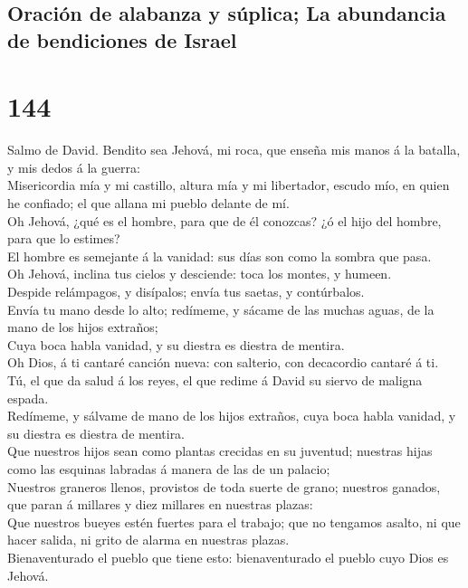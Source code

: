 \hypertarget{oraciuxf3n-de-alabanza-y-suxfaplica-la-abundancia-de-bendiciones-de-israel}{%
\subsection{Oración de alabanza y súplica; La abundancia de bendiciones
de
Israel}\label{oraciuxf3n-de-alabanza-y-suxfaplica-la-abundancia-de-bendiciones-de-israel}}

\hypertarget{section-19-144}{%
\section{144}\label{section-19-144}}

 Salmo de David. Bendito sea Jehová, mi roca, que enseña
mis manos á la batalla, y mis dedos á la guerra:\\
 Misericordia mía y mi castillo, altura mía y mi
libertador, escudo mío, en quien he confiado; el que allana mi pueblo
delante de mí.\\
 Oh Jehová, ¿qué es el hombre, para que de él conozcas? ¿ó
el hijo del hombre, para que lo estimes?\\
 El hombre es semejante á la vanidad: sus días son como la
sombra que pasa.\\
 Oh Jehová, inclina tus cielos y desciende: toca los
montes, y humeen.\\
 Despide relámpagos, y disípalos; envía tus saetas, y
contúrbalos.\\
 Envía tu mano desde lo alto; redímeme, y sácame de las
muchas aguas, de la mano de los hijos extraños;\\
 Cuya boca habla vanidad, y su diestra es diestra de
mentira.\\
 Oh Dios, á ti cantaré canción nueva: con salterio, con
decacordio cantaré á ti.\\
 Tú, el que da salud á los reyes, el que redime á David
su siervo de maligna espada.\\
 Redímeme, y sálvame de mano de los hijos extraños, cuya
boca habla vanidad, y su diestra es diestra de mentira.\\
 Que nuestros hijos sean como plantas crecidas en su
juventud; nuestras hijas como las esquinas labradas á manera de las de
un palacio;\\
 Nuestros graneros llenos, provistos de toda suerte de
grano; nuestros ganados, que paran á millares y diez millares en
nuestras plazas:\\
 Que nuestros bueyes estén fuertes para el trabajo; que
no tengamos asalto, ni que hacer salida, ni grito de alarma en nuestras
plazas.\\
 Bienaventurado el pueblo que tiene esto: bienaventurado
el pueblo cuyo Dios es Jehová.

